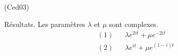 \begin{tiny}(Ced03)\end{tiny} Résultats. Les paramètres $\lambda$ et $\mu$ sont complexes.
\begin{align*}
 &(1)& &\lambda e^{2it} + \mu e^{-2i t}\\
 &(2)& &\lambda e^{it} + \mu e^{(1-i) t}\\
 \end{align*}